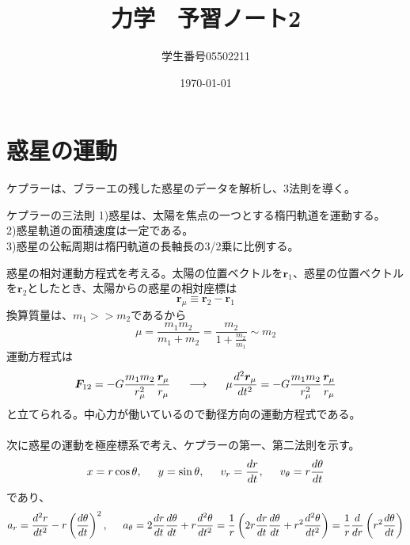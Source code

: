 \documentclass{jsarticle}
\title{力学　予習ノート2}
\author{学生番号05502211}
\date{\today}
\begin{document}
\maketitle
\section{惑星の運動}
ケプラーは、ブラーエの残した惑星のデータを解析し、3法則を導く。\\
\begin{itembox}[l]{ケプラーの三法則}
1)\hspace{5mm}惑星は、太陽を焦点の一つとする楕円軌道を運動する。\\
2)\hspace{5mm}惑星軌道の面積速度は一定である。\\
3)\hspace{5mm}惑星の公転周期は楕円軌道の長軸長の3/2乗に比例する。
\end{itembox}
惑星の相対運動方程式を考える。太陽の位置ベクトルを\(\bm{r}_{1}\)、惑星の位置ベクトルを\(\bm{r}_{2}\)としたとき、太陽からの惑星の相対座標は
\[\bm{r}_{\mu}\equiv\bm{r}_{2}-\bm{r}_{1}\]
換算質量は、\(m_{1}>>m_{2}\)であるから
\[\mu=\frac{m_{1}m_{2}}{m_{1}+m_{2}}=\frac{m_{2}}{1+\frac{m_{2}}{m_{1}}}\sim m_{2}\]
運動方程式は
\begin{equation}
\bm{F}_{12}=-G\frac{m_{1}m_{2}}{{r}_{\mu}^{2}}\frac{\bm{r}_{\mu}}{r_{\mu}}\hspace{5mm}\longrightarrow\hspace{5mm}\mu\frac{d^{2}\bm{r}_{\mu}}{dt^{2}}=-G\frac{m_{1}m_{2}}{r_{\mu}^{2}}\frac{\bm{r}_{\mu}}{r_{\mu}}
\end{equation}
と立てられる。中心力が働いているので動径方向の運動方程式である。\\
\\
次に惑星の運動を極座標系で考え、ケプラーの第一、第二法則を示す。
\begin{equation*}
x=r\cos\theta,\hspace{5mm}y=\sin\theta,\hspace{5mm}v_{r}=\frac{dr}{dt},\hspace{5mm}v_{\theta}=r\frac{d\theta}{dt}
\end{equation*}
であり、
\begin{equation*}
a_{r}=\frac{d^{2}r}{dt^{2}}-r\left(\frac{d\theta}{dt}\right)^{2},\hspace{5mm}
a_{\theta}=2\frac{dr}{dt}\frac{d\theta}{dt}+r\frac{d^{2}\theta}{dt^{2}}=\frac{1}{r}\left(2r\frac{dr}{dt}\frac{d\theta}{dt}+r^{2}\frac{d^{2}\theta}{dt^2}\right)=\frac{1}{r}\frac{d}{dr}\left(r^{2}\frac{d\theta}{dt}\right)
\end{equation*}
\end{document}
